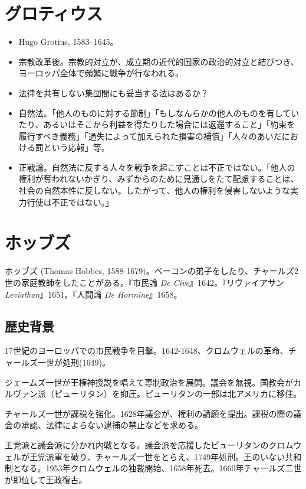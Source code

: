 \documentclass[uplatex,dvipdfmx]{jsarticle} \usepackage{mystyle}%
\begin{document}
 \section{グロティウス}

 \begin{itemize}
 \item Hugo Grotius, 1583--1645。
 \item 宗教改革後。宗教的対立が、成立期の近代的国家の政治的対立と結びつき、ヨーロッパ全体で頻繁に戦争が行なわれる。
 \item 法律を共有しない集団間にも妥当する法はあるか？
 \item 自然法。「他人のものに対する節制」「もしなんらかの他人のものを有していたり、あるいはそこから利益を得たりした場合には返還すること」「約束を履行すべき義務」「過失によって加えられた損害の補償」「人々のあいだにおける罰という応報」等。
 \item 正戦論。自然法に反する人々を戦争を起こすことは不正ではない。「他人の権利が奪われないかぎり、みずからのために見通しをたて配慮することは、社会の自然本性に反しない。したがって、他人の権利を侵害しないような実力行使は不正ではない。」
 \end{itemize}
 \fi

\section{ホッブズ}

ホッブズ (Thomas Hobbes, 1588-1679)。ベーコンの弟子をしたり、チャールズ2世の家庭教師をしたことがある。『市民論 \emph{De Cive}』1642。『リヴァイアサン \emph{Leviathan}』1651。『人間論 \emph{De Hormine}』1658。

\subsection{歴史背景}




17世紀のヨーロッパでの市民戦争を目撃。1642-1648、クロムウェルの革命、チャールズ一世が処刑(1649)。

ジェームズ一世が王権神授説を唱えて専制政治を展開。議会を無視。国教会がカルヴァン派（ピューリタン）を抑圧。ピューリタンの一部は北アメリカに移住。

チャールズ一世が課税を強化。1628年議会が、権利の請願を提出。課税の際の議会の承認、法律によらない逮捕の禁止などを求める。

王党派と議会派に分かれ内戦となる。議会派を応援したピューリタンのクロムウェルが王党派軍を破り、チャールズ一世をとらえ、1749年処刑。王のいない共和制となる。1953年クロムウェルの独裁開始、1658年死去。1660年チャールズ二世が即位して王政復古。
\end{document}
